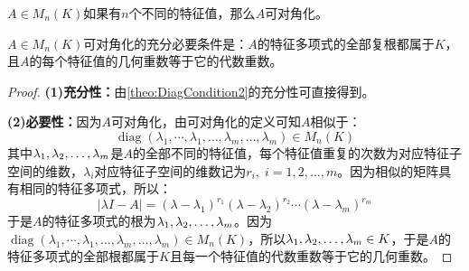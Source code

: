 \begin{corollary}
	$A\in M_{n}(K)$如果有$n$个不同的特征值，那么$A$可对角化。
\end{corollary}
\begin{theorem}[矩阵可对角化的第三个充分必要条件]
	$A\in M_{n}(K)$可对角化的充分必要条件是：$A$的特征多项式的全部复根都属于$K$，且$A$的每个特征值的几何重数等于它的代数重数。
\end{theorem}
\begin{proof}
	\textbf{(1)充分性：}由\cref{theo:DiagCondition2}的充分性可直接得到。\par
	\textbf{(2)必要性：}因为$A$可对角化，由可对角化的定义可知$A$相似于：
	\begin{equation*}
		\operatorname{diag}(\lambda_1,\cdots,\lambda_1,\dots,\lambda_m,\dots,\lambda_m)\in M_{n}(K)
	\end{equation*}
	其中$\lambda_1, \lambda_2, \dots, \lambda_{m}$是$A$的全部不同的特征值，每个特征值重复的次数为对应特征子空间的维数，$\lambda_i$对应特征子空间的维数记为$r_i,\;i=1,2,\dots,m$。因为相似的矩阵具有相同的特征多项式，所以：
	\begin{equation*}
		|\lambda I-A|=(\lambda-\lambda_1)^{r_1}(\lambda-\lambda_2)^{r_2}\cdots(\lambda-\lambda_m)^{r_m}
	\end{equation*}
	于是$A$的特征多项式的根为$\lambda_1, \lambda_2, \dots, \lambda_{m}$。因为$\operatorname{diag}(\lambda_1,\cdots,\lambda_1,\dots,\lambda_m,\dots,\lambda_m)\in M_{n}(K)$，所以$\lambda_1, \lambda_2, \dots, \lambda_{m}\in K$，于是$A$的特征多项式的全部根都属于$K$且每一个特征值的代数重数等于它的几何重数。
\end{proof}

